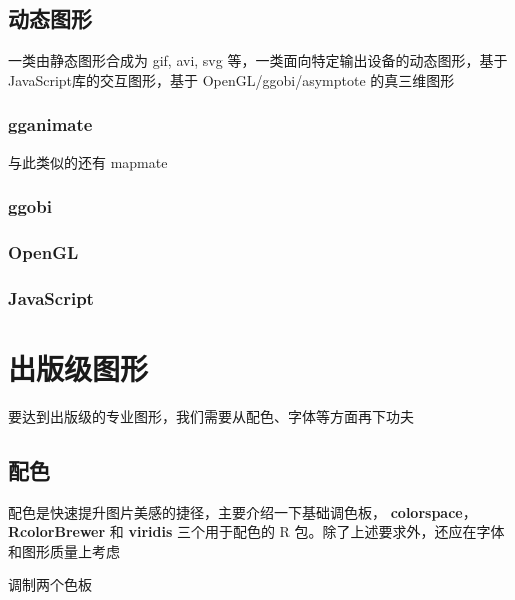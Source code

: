 \documentclass[a4paper,oneside,UTF8]{book}
\begin{document}
\hypertarget{dynamic-graphics}{%
\section{动态图形}\label{dynamic-graphics}}

一类由静态图形合成为 gif, avi, svg 等，一类面向特定输出设备的动态图形，基于JavaScript库的交互图形，基于 OpenGL/ggobi/asymptote 的真三维图形

\hypertarget{grammar-of-animated-graphics}{%
\subsection{gganimate}\label{grammar-of-animated-graphics}}

与此类似的还有 mapmate

\hypertarget{ggobi}{%
\subsection{ggobi}\label{ggobi}}

\hypertarget{opengl}{%
\subsection{OpenGL}\label{opengl}}

\hypertarget{javascript}{%
\subsection{JavaScript}\label{javascript}}

\hypertarget{Published-Graphics}{%
\chapter{出版级图形}\label{Published-Graphics}}

要达到出版级的专业图形，我们需要从配色、字体等方面再下功夫

\hypertarget{pick-colors}{%
\section{配色}\label{pick-colors}}

配色是快速提升图片美感的捷径，主要介绍一下基础调色板， \textbf{colorspace}，\textbf{RcolorBrewer} 和 \textbf{viridis} 三个用于配色的 R 包。除了上述要求外，还应在字体和图形质量上考虑

调制两个色板
\end{document}
